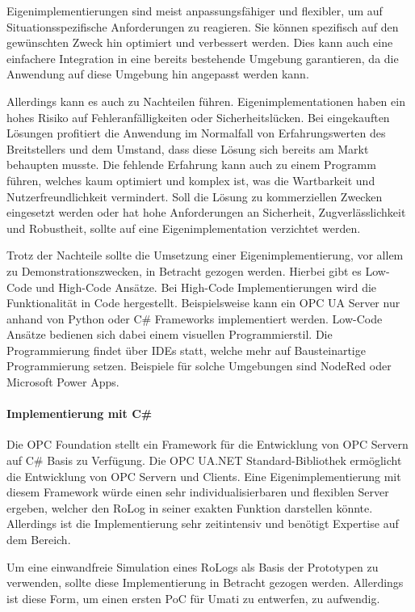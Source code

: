 \documentclass[a4paper, 12pt, oneside, toc=listofnumbered, bibliography=totoc]{scrbook}
\begin{document}
			Eigenimplementierungen sind meist anpassungsfähiger und flexibler, um auf Situationsspezifische Anforderungen zu reagieren. Sie können spezifisch auf den gewünschten Zweck hin optimiert und verbessert werden. Dies kann auch eine einfachere Integration in eine bereits bestehende Umgebung garantieren, da die Anwendung auf diese Umgebung hin angepasst werden kann.
			
			Allerdings kann es auch zu Nachteilen führen. Eigenimplementationen haben ein hohes Risiko auf Fehleranfälligkeiten oder Sicherheitslücken. Bei eingekauften Lösungen profitiert die Anwendung im Normalfall von Erfahrungswerten des Breitstellers und dem Umstand, dass diese Lösung sich bereits am Markt behaupten musste. Die fehlende Erfahrung kann auch zu einem Programm führen, welches kaum optimiert und komplex ist, was die Wartbarkeit und Nutzerfreundlichkeit vermindert. Soll die Lösung zu kommerziellen Zwecken eingesetzt werden oder hat hohe Anforderungen an Sicherheit, Zugverlässlichkeit und Robustheit, sollte auf eine Eigenimplementation verzichtet werden.
			
			Trotz der Nachteile sollte die Umsetzung einer Eigenimplementierung, vor allem zu Demonstrationszwecken, in Betracht gezogen werden. Hierbei gibt es Low-Code und High-Code Ansätze. Bei High-Code Implementierungen wird die Funktionalität in Code hergestellt. Beispielsweise kann ein OPC UA Server nur anhand von Python oder C\# Frameworks implementiert werden. Low-Code Ansätze bedienen sich dabei einem visuellen Programmierstil. Die Programmierung findet über IDEs statt, welche mehr auf Bausteinartige Programmierung setzen. Beispiele für solche Umgebungen sind NodeRed oder Microsoft Power Apps. 
			
			\paragraph{Implementierung mit C\#}
			Die OPC Foundation stellt ein Framework für die Entwicklung von OPC Servern auf C\# Basis zu Verfügung. Die OPC UA.NET Standard-Bibliothek ermöglicht die Entwicklung von OPC Servern und Clients. Eine Eigenimplementierung mit diesem Framework würde einen sehr individualisierbaren und flexiblen Server ergeben, welcher den RoLog in seiner exakten Funktion darstellen könnte. Allerdings ist die Implementierung sehr zeitintensiv und benötigt Expertise auf dem Bereich. \cite{noauthor_opc_nodate-1}
			
			Um eine einwandfreie Simulation eines RoLogs als Basis der Prototypen zu verwenden, sollte diese Implementierung in Betracht gezogen werden. Allerdings ist diese Form, um einen ersten \ac{PoC} für Umati zu entwerfen, zu aufwendig.
			
\end{document}
